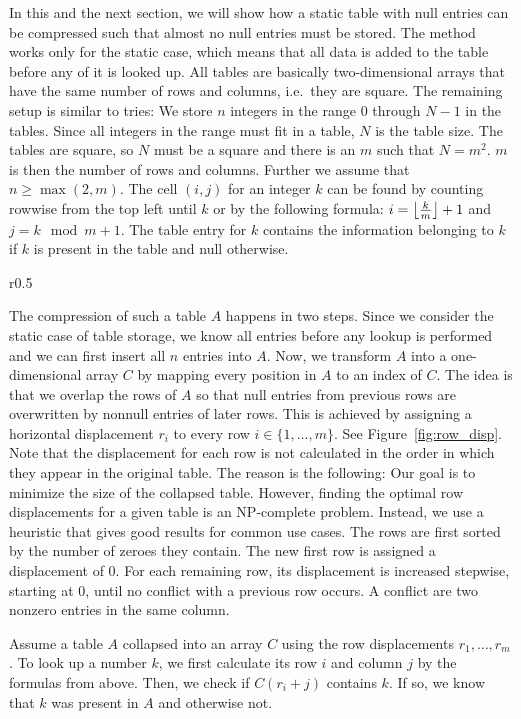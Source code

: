 In this and the next section, we will show how a static table with null entries can be compressed such that almost no null entries must be stored.
The method works only for the static case, which means that all data is added to the table before any of it is looked up.
All tables are basically two-dimensional arrays that have the same number of rows and columns, i.e.\ they are square.
The remaining setup is similar to tries:
We store $n$ integers in the range $0$ through $N - 1$ in the tables.
Since all integers in the range must fit in a table, $N$ is the table size.
The tables are square, so $N$ must be a square and there is an $m$ such that $N = m^2$.
$m$ is then the number of rows and columns.
Further we assume that $n \geq \max(2, m)$.
The cell $(i, j)$ for an integer $k$ can be found by counting rowwise from the top left until $k$ or by the following formula: $i = \left\lfloor \frac{k}{m} \right\rfloor + 1$ and $j = k \mod m + 1$.
The table entry for $k$ contains the information belonging to $k$ if $k$ is present in the table and null otherwise.

\begin{wrapfigure}{r}{0.5\textwidth}
  
	\caption{ \small Rows of a table displaced and collapsed into a one-dimensional array. \label{fig:row_disp}}
\end{wrapfigure}

The compression of such a table $A$ happens in two steps.
Since we consider the static case of table storage, we know all entries before any lookup is performed and we can first insert all $n$ entries into $A$.
Now, we transform $A$ into a one-dimensional array $C$ by mapping every position in $A$ to an index of $C$.
The idea is that we overlap the rows of $A$ so that null entries from previous rows are overwritten by nonnull entries of later rows.
This is achieved by assigning a horizontal displacement $r_i$ to every row $i \in \{ 1, \ldots, m \}$.
See Figure~\ref{fig:row_disp}.
Note that the displacement for each row is not calculated in the order in which they appear in the original table.
The reason is the following:
Our goal is to minimize the size of the collapsed table.
However, finding the optimal row displacements for a given table is an NP-complete problem.
Instead, we use a heuristic that gives good results for common use cases.
The rows are first sorted by the number of zeroes they contain.
The new first row is assigned a displacement of 0.
For each remaining row, its displacement is increased stepwise, starting at 0, until no conflict with a previous row occurs.
A conflict are two nonzero entries in the same column.

Assume a table $A$ collapsed into an array $C$ using the row displacements $r_1, \ldots, r_m$.
To look up a number $k$, we first calculate its row $i$ and column $j$ by the formulas from above.
Then, we check if $C( r_i + j )$ contains $k$.
If so, we know that $k$ was present in $A$ and otherwise not.
